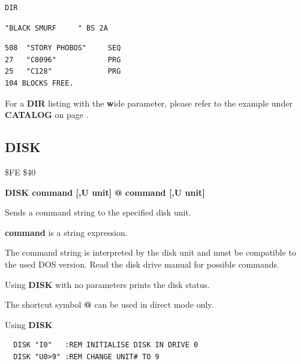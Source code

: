 \begin{description}[leftmargin=2cm,style=nextline]
\begin{tcolorbox}[colback=black,coltext=white]
\verbatimfont{\codefont}
\begin{verbatim}
DIR
\end{verbatim}
\selectfont{\codefont 0}
\begin{tcolorbox}[colback=white,coltext=black,arc=0mm,boxrule=0mm,
       left*=0.5mm,right*=0mm,top=0mm,bottom=0mm,nobeforeafter,
       left skip=0.5mm,
       width=28mm,height=3mm,valign=center]
\begin{verbatim}
"BLACK SMURF     " BS 2A
\end{verbatim}
\end{tcolorbox}
\begin{verbatim}
508  "STORY PHOBOS"     SEQ
27   "C8096"            PRG
25   "C128"             PRG
104 BLOCKS FREE.
\end{verbatim}
\end{tcolorbox}

For a {\bf DIR} listing with the {\bf w}ide parameter, please refer to the example under {\bf CATALOG}
on page \pageref{3columndirlisting}.

\end{description}


\newpage
\subsection{DISK}
\begin{description}[leftmargin=2cm,style=nextline]
\item [Token:] \$FE \$40
\item [Format:] {\bf DISK command [,U unit] }
                {\bf @ command [,U unit] }
\item [Usage:]

   Sends a command string to the specified disk unit.

   \unitdefinition

   {\bf command} is a string expression.

\item [Remarks:]
   The command string is interpreted by the disk unit
   and must be compatible to the used DOS version.
   Read the disk drive manual for possible commands.

   Using {\bf DISK} with no parameters prints the disk status.

   The shortcut symbol {\bf @}  can be used in direct mode only.

\item [Examples:] Using {\bf DISK}
\begin{tcolorbox}[colback=black,coltext=white]
\verbatimfont{\codefont}
\begin{verbatim}
  DISK "I0"   :REM INITIALISE DISK IN DRIVE 0
  DISK "U0>9" :REM CHANGE UNIT# TO 9
\end{verbatim}
\end{tcolorbox}
\end{description}

